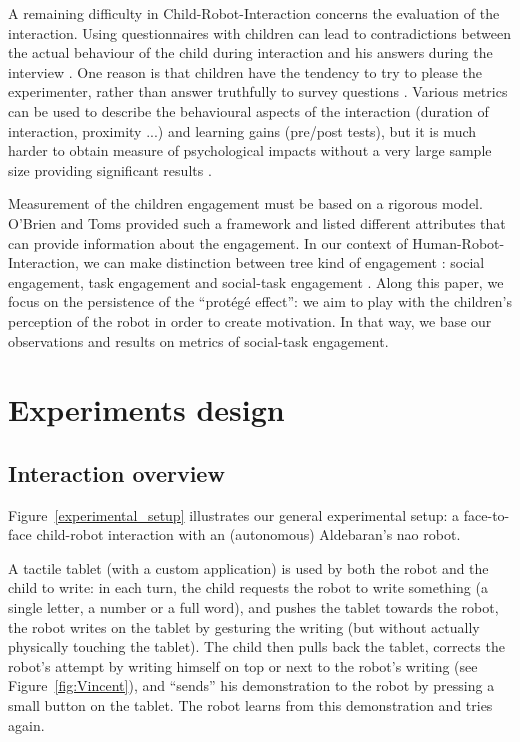 \documentclass{sig-alternate}
\begin{document}
A remaining difficulty in Child-Robot-Interaction concerns the evaluation of the interaction. Using questionnaires with children can lead to contradictions between the actual behaviour of the child during interaction and his answers during the interview \cite{lemaignan2015youre}. One reason is that children have the tendency to try to please the experimenter, rather than answer truthfully to survey questions \cite{belpaeme2013child}. Various metrics can be used to describe the behavioural aspects of the interaction (duration of interaction, proximity ...) and learning gains (pre/post tests), but it is much harder to obtain measure of psychological impacts without a very large sample size providing significant results \cite{belpaeme2013child}. 

Measurement of the children engagement must be based on a rigorous model. O'Brien and Toms \cite{o2008user} provided such a framework and listed different attributes that can provide information about the engagement. In our context of Human-Robot-Interaction, we can make distinction between tree kind of engagement : social engagement, task engagement and social-task engagement \cite{corrigan2013social}. Along this paper, we focus on the persistence of the ``prot\'eg\'e effect'': we aim to play with the children's perception of the robot in order to create motivation. In that way, we base our observations and results on metrics of social-task engagement. 


\section{Experiments design}
\subsection{Interaction overview}
Figure~\ref{experimental_setup} illustrates our general experimental setup: a
face-to-face child-robot interaction with an (autonomous) Aldebaran's {\sc nao}
robot.

A tactile tablet (with a custom application) is used by both the robot and the
child to write: in each turn, the child requests the robot to write
something (a single letter, a number or a full word), and pushes the tablet
towards the robot, the robot writes on the tablet by gesturing the writing (but
without actually physically touching the tablet). The child then pulls back the
tablet, corrects the robot's attempt by writing himself on top or next to
the robot's writing (see Figure~\ref{fig:Vincent}), and ``sends'' his
demonstration to the robot by pressing a small button on the tablet. The robot
learns from this demonstration and tries again.
\end{document}
